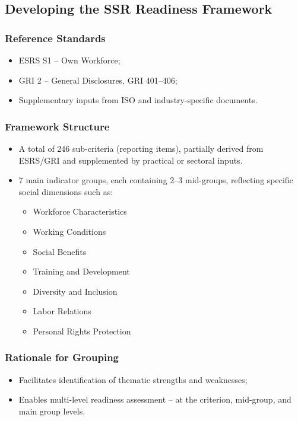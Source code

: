 \subsection{Developing the SSR Readiness Framework}
\subsubsection{Reference Standards}
\begin{itemize}
    \item ESRS S1 -- Own Workforce;
    \item GRI 2 -- General Disclosures, GRI 401--406;
    \item Supplementary inputs from ISO and industry-specific documents.
\end{itemize}

\subsubsection{Framework Structure}
\begin{itemize}
    \item A total of 246 sub-criteria (reporting items), partially derived from ESRS/GRI and supplemented by practical or sectoral inputs.
    \item 7 main indicator groups, each containing 2--3 mid-groups, reflecting specific social dimensions such as:
    \begin{itemize}
        \item Workforce Characteristics
        \item Working Conditions
        \item Social Benefits
        \item Training and Development
        \item Diversity and Inclusion
        \item Labor Relations
        \item Personal Rights Protection
    \end{itemize}
\end{itemize}

\subsubsection{Rationale for Grouping}
\begin{itemize}
    \item Facilitates identification of thematic strengths and weaknesses;
    \item Enables multi-level readiness assessment -- at the criterion, mid-group, and main group levels.
\end{itemize}

